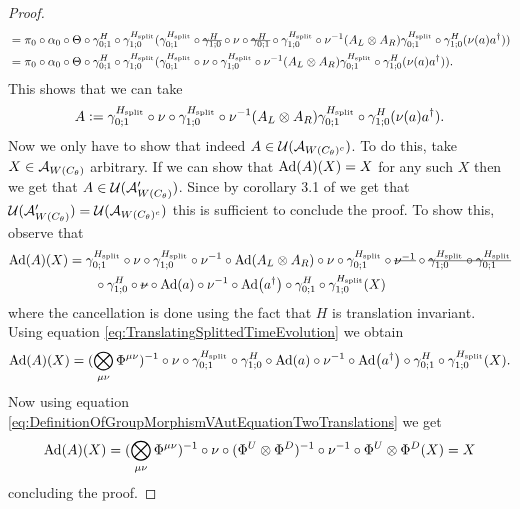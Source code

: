 \documentclass[12pt,a4paper,twoside]{article}
\numberwithin{equation}{section}
\begin{document}
\begin{proof}
	\begin{align}
		&=\pi_0\circ\alpha_0\circ\Theta\circ\gamma^H_{0;1}\circ\gamma^{H_\text{split}}_{1;0}(\gamma^{H_\text{split}}_{0;1}\circ\stkout{\gamma^H_{1;0}}\circ\nu\circ\stkout{\gamma^H_{0;1}}\circ\gamma^{H_\text{split}}_{1;0}\circ\nu^{-1}(A_L\otimes A_R)\gamma^{H_\text{split}}_{0;1}\circ\gamma^H_{1;0}(\nu(a)a^\dagger))\\
		&=\pi_0\circ\alpha_0\circ\Theta\circ\gamma^H_{0;1}\circ\gamma^{H_\text{split}}_{1;0}(\gamma^{H_\text{split}}_{0;1}\circ\nu\circ\gamma^{H_\text{split}}_{1;0}\circ\nu^{-1}(A_L\otimes A_R)\gamma^{H_\text{split}}_{0;1}\circ\gamma^H_{1;0}(\nu(a)a^\dagger)).
	\end{align}
	This shows that we can take
	\begin{equation}
		A\defeq \gamma^{H_\text{split}}_{0;1}\circ\nu\circ\gamma^{H_\text{split}}_{1;0}\circ\nu^{-1}(A_L\otimes A_R)\gamma^{H_\text{split}}_{0;1}\circ\gamma^H_{1;0}(\nu(a)a^\dagger).
	\end{equation}
	Now we only have to show that indeed $A\in\UU(\AA_{W(C_\theta)^c})$. To do this, take $X\in\AA_{W(C_\theta)}$ arbitrary. If we can show that $\Ad{A}(X)=X$ for any such $X$ then we get that $A\in\UU(\AA_{W(C_\theta)}')$. Since by corollary 3.1 of \cite{NaScWe_2013} we get that $\UU(\AA_{W(C_\theta)}')=\UU(\AA_{W(C_\theta)^c})$ this is sufficient to conclude the proof. To show this, observe that
	\begin{align}
		\Ad{A}(X)&=\gamma^{H_\text{split}}_{0;1}\circ\nu\circ\gamma^{H_\text{split}}_{1;0}\circ\nu^{-1}\circ\Ad{A_L\otimes A_R}\circ\nu\circ\gamma^{H_\text{split}}_{0;1}\circ\stkout{\nu^{-1}}\circ\stkout{\gamma^{H_\text{split}}_{1;0}\circ\gamma^{H_\text{split}}_{0;1}}\\
		&\nonumber
		\qquad\circ\gamma^H_{1;0}\circ\stkout{\nu}\circ\Ad{a}\circ\nu^{-1}\circ\Ad{a^\dagger}\circ\gamma^H_{0;1}\circ\gamma^{H_\text{split}}_{1;0}(X)
	\end{align}
	where the cancellation is done using the fact that $H$ is translation invariant. Using equation \eqref{eq:TranslatingSplittedTimeEvolution} we obtain
	\begin{equation}
		\Ad{A}(X)=(\bigotimes_{\mu\nu}\Phi^{\mu\nu})^{-1}\circ\nu\circ\gamma^{H_\text{split}}_{0;1}\circ\gamma^H_{1;0}\circ\Ad{a}\circ\nu^{-1}\circ\Ad{a^\dagger}\circ\gamma^H_{0;1}\circ\gamma^{H_\text{split}}_{1;0}(X).
	\end{equation}
	Now using equation \eqref{eq:DefinitionOfGroupMorphismVAutEquationTwoTranslations} we get
	\begin{equation}
		\Ad{A}(X)=(\bigotimes_{\mu\nu}\Phi^{\mu\nu})^{-1}\circ\nu\circ(\Phi^U\otimes\Phi^D)^{-1}\circ\nu^{-1}\circ\Phi^U\otimes\Phi^D(X)=X
	\end{equation}
	concluding the proof.
\end{proof}
\end{document}
